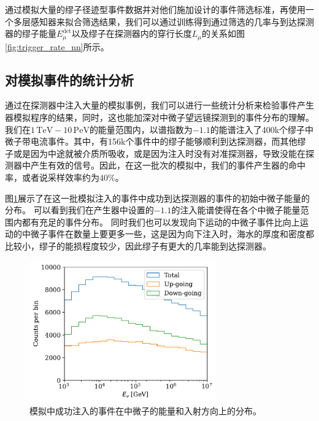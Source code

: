 通过模拟大量的缪子径迹型事件数据并对他们施加设计的事件筛选标准，再使用一个多层感知器来拟合筛选结果，我们可以通过训练得到通过筛选的几率与到达探测器的缪子能量$E_\mu^\mathrm{det}$以及缪子在探测器内的穿行长度$L_\mu$的关系如图\ref{fig:trigger_rate_nn}所示。


\subsection{对模拟事件的统计分析}

通过在探测器中注入大量的模拟事例，我们可以进行一些统计分析来检验事件产生器模拟程序的结果，同时，这也能加深对中微子望远镜探测到的事件分布的理解。
我们在$1\,\mathrm{TeV} - 10\,\mathrm{PeV}$的能量范围内，以谱指数为$-1.1$的能谱注入了400k个缪子中微子带电流事件。其中，有156k个事件中的缪子能够顺利到达探测器，而其他缪子或是因为中途就被介质所吸收，或是因为注入时没有对准探测器，导致没能在探测器中产生有效的信号。因此，在这一批次的模拟中，我们的事件产生器的命中率，或者说采样效率约为$40\%$。

图\ref{fig:sampling_energy_spectrum_unweighted}展示了在这一批模拟注入的事件中成功到达探测器的事件的初始中微子能量的分布。
可以看到我们在产生器中设置的$-1.1$的注入能谱使得在各个中微子能量范围内都有充足的事件分布。
同时我们也可以发现向下运动的中微子事件比向上运动的中微子事件在数量上要更多一些，这是因为向下注入时，海水的厚度和密度都比较小，缪子的能损程度较少，因此缪子有更大的几率能到达探测器。

\begin{figure}[!ht]%
    \centering
    \includegraphics[width=0.72\textwidth]{img/sampling_energy_spectrum_unweighted.pdf}
    \caption{模拟中成功注入的事件在中微子的能量和入射方向上的分布。}
    \label{fig:sampling_energy_spectrum_unweighted}
\end{figure}

